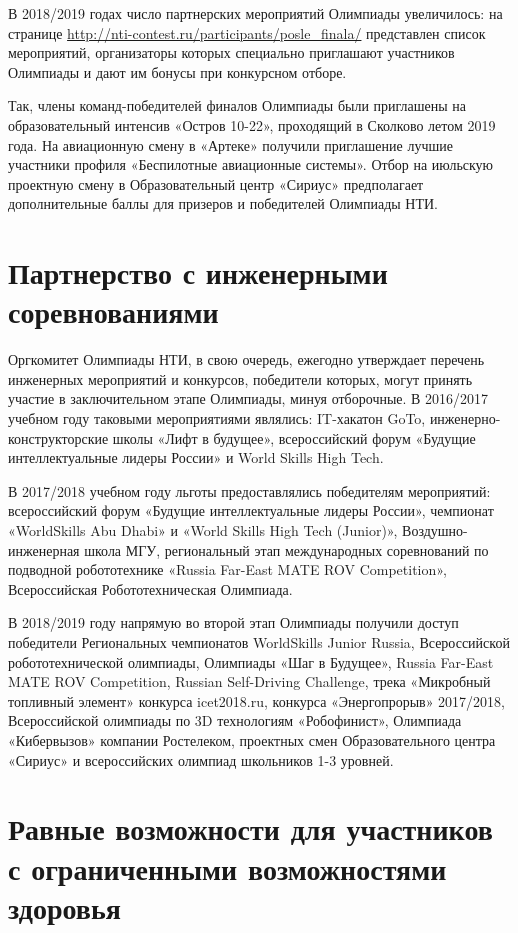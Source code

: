 В 2018/2019 годах число партнерских мероприятий Олимпиады увеличилось: на странице \url{http://nti-contest.ru/participants/posle_finala/} представлен список мероприятий, организаторы которых специально приглашают участников Олимпиады и дают им бонусы при конкурсном отборе.

Так, члены команд-победителей финалов Олимпиады были приглашены на образовательный интенсив «Остров 10-22», проходящий в Сколково летом 2019 года.  На авиационную смену в «Артеке» получили приглашение лучшие участники профиля «Беспилотные авиационные системы». Отбор на июльскую проектную смену в Образовательный центр «Сириус» предполагает дополнительные баллы для призеров и победителей Олимпиады НТИ.

\section*{Партнерство с инженерными соревнованиями}

Оргкомитет Олимпиады НТИ, в свою очередь, ежегодно утверждает перечень инженерных мероприятий и конкурсов, победители которых, могут принять участие в заключительном этапе Олимпиады, минуя отборочные. В 2016/2017 учебном году таковыми мероприятиями являлись: IT-хакатон GoTo, инженерно-конструкторские школы «Лифт в будущее»,  всероссийский форум «Будущие интеллектуальные лидеры России» и World Skills High Tech. 

В 2017/2018 учебном году льготы предоставлялись победителям мероприятий: всероссийский форум «Будущие интеллектуальные лидеры России», чемпионат \linebreak «WorldSkills Abu Dhabi» и «World Skills High Tech (Junior)», Воздушно-инженерная школа МГУ, региональный этап международных соревнований по подводной робототехнике «Russia Far-East MATE ROV Competition», Всероссийская Робототехническая Олимпиада.

В 2018/2019 году напрямую во второй этап Олимпиады получили доступ победители Региональных чемпионатов WorldSkills Junior Russia, Всероссийской робототехнической олимпиады, Олимпиады «Шаг в Будущее», Russia Far-East MATE ROV Competition, Russian Self-Driving Challenge, трека «Микробный топливный элемент» конкурса icet2018.ru, конкурса «Энергопрорыв» 2017/2018, Всероссийской олимпиады по 3D технологиям «Робофинист», Олимпиада «Кибервызов» компании Ростелеком, проектных смен Образовательного центра «Сириус» и всероссийских олимпиад школьников 1-3 уровней.

\section*{Равные возможности для участников с  ограниченными возможностями здоровья}

